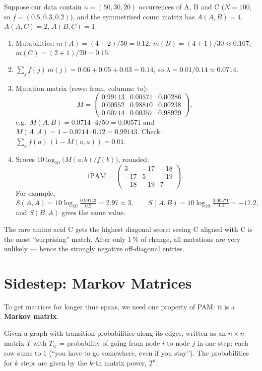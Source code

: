 \documentclass[11pt, oneside]{book}
\let\originalsection\section
\renewcommand{\section}{\Needspace{7\baselineskip}\originalsection}
\begin{document}
\begin{exbox}[title={1PAM for a three-letter alphabet}]
Suppose our data contain $n = (50, 30, 20)$ occurrences of A, B and C
($N = 100$, so $f = (0.5, 0.3, 0.2)$), and the symmetrised count matrix has
$A(A,B) = 4$, $A(A,C) = 2$, $A(B,C) = 1$.
\begin{enumerate}
  \item Mutabilities: $m(A) = (4+2)/50 = 0.12$, $m(B) = (4+1)/30 \approx 0.167$,
    $m(C) = (2+1)/20 = 0.15$.
  \item $\sum_j f(j)\,m(j) = 0.06 + 0.05 + 0.03 = 0.14$, so
    $\lambda = 0.01/0.14 \approx 0.0714$.
  \item Mutation matrix (rows: from, columns: to):
    \[
      M = \begin{pmatrix}
        0.99143 & 0.00571 & 0.00286 \\
        0.00952 & 0.98810 & 0.00238 \\
        0.00714 & 0.00357 & 0.98929
      \end{pmatrix},
    \]
    e.g.\ $M(A,B) = 0.0714 \cdot 4/50 = 0.00571$ and
    $M(A,A) = 1 - 0.0714 \cdot 0.12 = 0.99143$. Check:
    $\sum_a f(a)\,(1 - M(a,a)) = 0.01$. \checkmark
  \item Scores $10 \log_{10}\bigl(M(a,b)/f(b)\bigr)$, rounded:
    \[
      \mathrm{1PAM} = \begin{pmatrix} 3 & -17 & -18 \\ -17 & 5 & -19 \\ -18 & -19 & 7 \end{pmatrix}.
    \]
    For example,
    \[
      S(A,A) = 10\log_{10}\tfrac{0.99143}{0.5} = 2.97 \approx 3, \qquad
      S(A,B) = 10\log_{10}\tfrac{0.00571}{0.3} = -17.2,
    \]
    and $S(B,A)$ gives the same value.
\end{enumerate}
The rare amino acid C gets the highest diagonal score: seeing C aligned with
C is the most ``surprising'' match. After only 1\,\% of change, all mutations
are very unlikely --- hence the strongly negative off-diagonal entries.
\end{exbox}

\section{Sidestep: Markov Matrices}
\label{sec:markov}

To get matrices for longer time spans, we need one property of PAM: it is a
\textbf{Markov matrix}.

\begin{defbox}[title={Markov (transition) matrix}]
Given a graph with transition probabilities along its edges, written as an
$n \times n$ matrix $T$ with $T_{ij}$ = probability of going from node $i$ to
node $j$ in one step: each row sums to 1 (``you have to go somewhere, even if
you stay''). The probabilities for $k$ steps are given by the $k$-th matrix
power, $T^k$.
\end{defbox}
\end{document}
